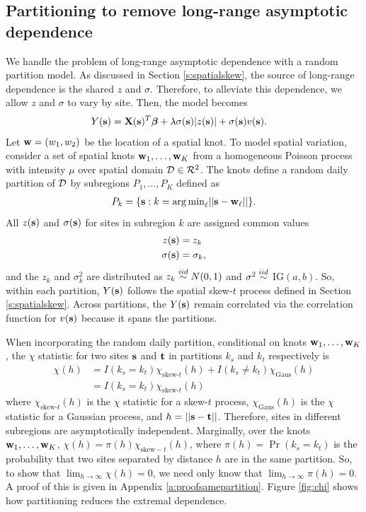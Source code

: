 \documentclass[11pt]{article}
\begin{document}
\subsection{Partitioning to remove long-range asymptotic dependence}\label{s:part}
We handle the problem of long-range asymptotic dependence with a random partition model.
As discussed in Section \ref{s:spatialskew}, the source of long-range dependence is the shared $z$ and $\sigma$.
Therefore, to alleviate this dependence, we allow $z$ and $\sigma$ to vary by site.
Then, the model becomes
\begin{align} \label{eq:partition}
  Y(\mbox{\bf s}) &= \mbox{\bf X}(\mbox{\bf s})^T \mbox{\boldmath $\beta$} + \lambda \sigma(\mbox{\bf s}) |z(\mbox{\bf s})| + \sigma(\mbox{\bf s}) v(\mbox{\bf s}).
\end{align}
Let $\mbox{\bf w} = (w_1, w_2)$ be the location of a spatial knot.
To model spatial variation, consider a set of spatial knots $\mbox{\bf w}_1, \ldots, \mbox{\bf w}_K$ from a homogeneous Poisson process with intensity $\mu$ over spatial domain ${\cal D} \in {\cal R}^2$.
The knots define a random daily partition of ${\cal D}$ by subregions $P_{1}, \ldots, P_{K}$ defined as
\begin{align} \label{eq:subregions}
  P_{k} = \{ \mbox{\bf s} : k = {\mathop{\rm arg\, min}}_\ell || \mbox{\bf s} - \mbox{\bf w}_{\ell} || \}.
\end{align}
All $z(\mbox{\bf s})$ and $\sigma(\mbox{\bf s})$ for sites in subregion $k$ are assigned common values
\begin{align}
  z(\mbox{\bf s}) &= z_{k} \label{eq:sitez}\\
  \sigma(\mbox{\bf s}) &= \sigma_{k} \label{eq:sitesig},
\end{align}
and the $z_k$ and $\sigma^2_k$ are distributed as $z_k \stackrel{iid}{\sim} N(0, 1)$ and $\sigma^2 \stackrel{iid}{\sim}$ IG$(a, b)$.
So, within each partition, $Y(\mbox{\bf s})$ follows the spatial skew-$t$ process defined in Section \ref{s:spatialskew}.
Across partitions, the $Y(\mbox{\bf s})$ remain correlated via the correlation function for $v(\mbox{\bf s})$ because it spans the partitions.

When incorporating the random daily partition, conditional on knots $\mbox{\bf w}_1, \ldots, \mbox{\bf w}_K$, the $\chi$ statistic for two sites $\mbox{\bf s}$ and $\mbox{\bf t}$ in partitions $k_s$ and $k_t$ respectively is
\begin{align}
  \chi(h) &= I(k_s = k_t) \chi_{\text{skew-}t}(h) + I(k_s \neq k_t) \chi_{\text{Gaus}}(h) \nonumber \\
         &= I(k_s = k_t) \chi_{\text{skew-}t}(h)
\end{align}
where $\chi_{\text{skew-}t}(h)$ is the $\chi$ statistic for a skew-$t$ process, $\chi_{\text{Gaus}}(h)$ is the $\chi$ statistic for a Gaussian process, and $h = ||\mbox{\bf s} - \mbox{\bf t}||$.
Therefore, sites in different subregions are asymptotically independent.
Marginally, over the knots $\mbox{\bf w}_1, \ldots, \mbox{\bf w}_K$, $\chi(h) = \pi(h) \chi_{\text{skew}-t}(h)$, where $\pi(h) = \Pr(k_s = k_t)$ is the probability that two sites separated by distance $h$ are in the same partition.
So, to show that $\lim_{h \rightarrow \infty} \chi(h) = 0$, we need only know that $\lim_{h \rightarrow \infty} \pi(h) = 0$.
A proof of this is given in Appendix \ref{a:proofsamepartition}.
Figure \ref{fig:chi} shows how partitioning reduces the extremal dependence.
\end{document}
